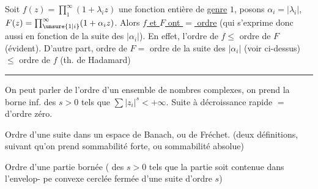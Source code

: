 Soit $f(z)=\prod_1^\infty(1+\lambda_i z)$ une fonction entière
de \uline{genre} $1$, posons $\alpha_i=|\lambda_i|$, $F(z)=\prod_{\unsure{1|i}}^\infty(1+\alpha_i z)$.
Alors \uline{$f$ et $F$ ont $=$ ordre} (qui s'exprime donc
aussi en fonction de la suite des $|\alpha_i|$). En effet,
l'ordre de $f\leq$ ordre de $F$ (évident). D'autre
part, ordre de $F=$ ordre de la suite des $|\alpha_i|$
(voir ci-dessus) $\leq$ ordre de $f$ (th. de Hadamard)
\begin{center}\rule{1.5cm}{0.4pt}\end{center}

On peut parler de l'ordre d'un ensemble  de
nombres complexes,  
on prend la borne inf. des $s>0$ tels que
$\sum|z_i|^s<+\infty$. Suite à décroissance rapide $=$
d'ordre zéro.

Ordre d'une suite dans un espace de Banach,
ou de Fréchet. (deux définitions, suivant qu'on
prend sommabilité forte, ou sommabilité absolue)

Ordre d'une partie bornée (  des
$s>0$ tels que la partie soit contenue dans l'envelop-\newline
pe convexe cerclée fermée d'une suite d'ordre $s$)
